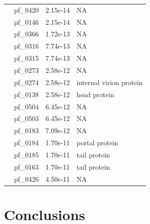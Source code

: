 \begin{table}
\begin{lrbox}{\rightbox}
\begin{tabular}[t]{llll}
                                        & pf\_0420 & 2.15e-14 & NA \\ 
                                        & pf\_0146 & 2.15e-14 & NA \\ 
                                        & pf\_0366 & 1.72e-13 & NA \\ 
                                        & pf\_0316 & 7.74e-13 & NA \\ 
                                        & pf\_0315 & 7.74e-13 & NA \\ 
                                        & pf\_0273 & 2.58e-12 & NA \\ 
                                        & pf\_0274 & 2.58e-12 & internal virion protein \\ 
                                        & pf\_0138 & 2.58e-12 & head protein \\ 
                                        & pf\_0504 & 6.45e-12 & NA \\ 
                                        & pf\_0503 & 6.45e-12 & NA \\ 
                                        & pf\_0183 & 7.09e-12 & NA \\ 
                                        & pf\_0184 & 1.70e-11 & portal protein \\ 
                                        & pf\_0185 & 1.70e-11 & tail protein \\ 
                                        & pf\_0163 & 1.70e-11 & tail protein \\ 
                                        & pf\_0426 & 4.50e-11 & NA \\ 
            \bottomrule
            \end{tabular}
    \end{lrbox}


    \centering
    \makebox[0pt]{%
        \hspace*{\fill}
        \begin{minipage}[t]{\wd\leftbox}
        \usebox{\leftbox}
        \end{minipage}\hfill
        \begin{minipage}[t]{\wd\rightbox}
        \usebox{\rightbox}
        \end{minipage}
        \hspace*{\fill}
        }
    \label{phage:table:cluster_functions}
\end{table}

\section{Conclusions}
\label{phage:sec:conclusions}

